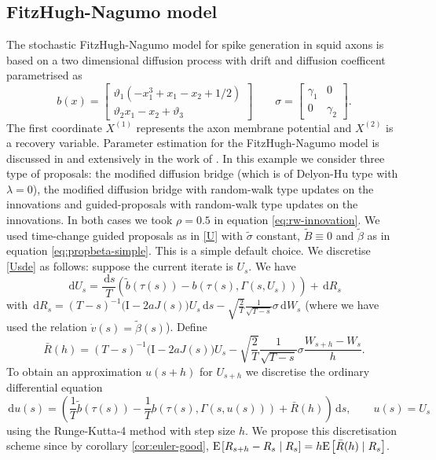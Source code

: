 \documentclass[preprint]{imsart}
\newcommand{\si}{\sigma}
\newcommand{\la}{\lambda}
\newcommand{\ga}{\gamma}
\renewcommand{\tilde}{\widetilde}
\providecommand{\I}{\mathrm{I}}
\theoremstyle{definition}
\newcommand{\dd}{{\,\mathrm d}}
\newcommand{\expec}[1]{\ensuremath{{\rm E}\mspace{-1mu}\left[#1\right]}}
\begin{document}


\subsection{FitzHugh-Nagumo model}\label{sec:fitz}

The stochastic FitzHugh-Nagumo model for spike generation in squid axons is based on a two dimensional diffusion process 
with drift and diffusion coefficent parametrised as
\[ b(x)= \begin{bmatrix} \vartheta_1 (- x_1^3+x_1-x_2 + 1/2)\\
\vartheta_2 x_1- x_2 +\vartheta_3 \end{bmatrix} \qquad \si = \begin{bmatrix} \ga_1 & 0 \\ 0 & \ga_2\end{bmatrix}. \]
The first coordinate $X^{(1)}$ represents the axon membrane potential and $X^{(2)}$ is a recovery variable. Parameter estimation for the FitzHugh-Nagumo model is discussed in \cite{JensenDitlevsen} and extensively in the work of \cite{Jensen}.  
In this example we consider three type of proposals: the modified diffusion bridge (which is of Delyon-Hu type with $\la=0$), the modified diffusion bridge with random-walk type updates on the innovations and guided-proposals with random-walk type updates on the innovations. In both cases we took $\rho=0.5$ in equation \eqref{eq:rw-innovation}. 
We used time-change guided proposals as in \eqref{U} with $\tilde\sigma$ constant, $\tilde{B}\equiv 0$ and $\tilde\beta$ as in equation \eqref{eq:propbeta-simple}. This is a simple default choice.   We discretise \eqref{Usde} as follows: suppose the current iterate is $U_s$. We have
\begin{equation}\label{eq:U-dR}
\dd U_{s} =    \frac{\dd s}{T} (\tilde b(\tau(s))-b(\tau(s), \Gamma(s, U_s))) + \dd R_s
\end{equation}
with $\dd R_s= (T-s)^{-1}\Big(\I - 2a  J(s)\Big)  U_s \dd s - \sqrt{\frac{2}{T}} \frac1{\sqrt{T - s}} \sigma \dd W_s $ (where we have used  the relation $\dot{v}(s) = \tilde\beta(s)$).  
Define 
\[	\bar{R}(h)=(T-s)^{-1}\Big(\I - 2a  J(s)\Big)  U_s- \sqrt{\frac{2}{T}} \frac1{\sqrt{T - s}} \sigma  \frac{W_{s+h}-W_s}{h}. \]
To obtain an approximation $u(s+h)$ for  $U_{s+h}$ we  discretise the ordinary differential equation
\[ \dd u(s) =    \left(\frac{1}{T} \tilde b(\tau(s))-\frac{1}{T} b(\tau(s), \Gamma(s, u(s))) + \bar{R}(h) \right) \dd s, \qquad u(s) = U_s \]
 using the Runge-Kutta-4 method with step size $h$. 
We propose this discretisation scheme since by corollary \ref{cor:euler-good}, 
$\expec{R_{s+h} - R_s \mid R_s} = h \expec{\bar{R}(h) \mid R_s}$. 
\end{document}
